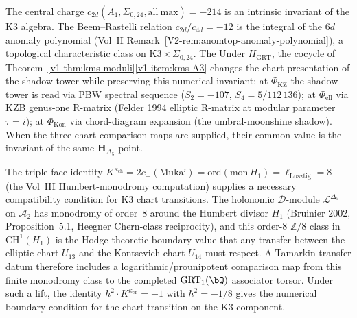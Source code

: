 \begin{remark}
\label{rem:kms-grt-transport-312}
The central charge
$c_{2d}(A_1,\Sigma_{0,24},\mathrm{all\ max})=-214$ is an intrinsic
invariant of the K3 algebra. The
Beem--Rastelli relation $c_{2d}/c_{4d}=-12$ is the integral of
the $6d$ anomaly polynomial
(Vol~II Remark~\ref{V2-rem:anomtop-anomaly-polynomial}), a
topological characteristic class on
$\mathrm K3\times\Sigma_{0,24}$. The
Under $H_{\mathrm{GRT}}$, the cocycle of
Theorem~\ref{v1-thm:kms-moduli}\ref{v1-item:kms-A3}
changes the chart presentation of the shadow tower while preserving this
numerical invariant: at
$\Phi_{\mathrm{KZ}}$ the shadow tower is read via PBW spectral
sequence ($S_2 = -107$, $S_4 = 5/112\,136$); at
$\Phi_{\mathrm{ell}}$ via KZB genus-one R-matrix (Felder 1994
elliptic R-matrix at modular parameter $\tau = i$); at
$\Phi_{\mathrm{Kon}}$ via chord-diagram expansion (the
umbral-moonshine shadow).  When the three chart comparison maps are
supplied, their common value is the invariant of the same
$\mathbf H_{\Delta_5}$ point.
\end{remark}

\begin{remark}
\label{rem:kms-humbert-cocycle}
The triple-face identity
$K^{\kappa_{\mathrm{ch}}} = 2 c_+(\mathrm{Mukai}) = \mathrm{ord}(\mathrm{mon}\,H_1)
= \ell_{\mathrm{Lusztig}} = 8$ (the Vol~III
Humbert-monodromy computation) supplies a necessary
compatibility condition for K3 chart transitions. The holonomic
$\mathcal D$-module $\mathcal L^{\Delta_5}$ on
$\overline{\mathcal A_2}$ has monodromy of order~$8$ around the
Humbert divisor $H_1$ (Bruinier 2002, Proposition~5.1,
Heegner Chern-class reciprocity), and this order-$8$
$\mathbb Z/8$ class in $\mathrm{CH}^1(H_1)$ is the
Hodge-theoretic boundary value that any transfer between the
elliptic chart $U_{13}$ and the Kontsevich chart $U_{14}$ must
respect.  A Tamarkin transfer datum therefore includes a
logarithmic/prounipotent comparison map from this finite monodromy
class to the completed $\mathrm{GRT}_1(\bQ)$ associator torsor.
Under such a lift, the identity
$\hbar^2\cdot K^{\kappa_{\mathrm{ch}}}=-1$ with
$\hbar^2=-1/8$ gives the numerical boundary condition for the
chart transition on the K3 component.
\end{remark}
